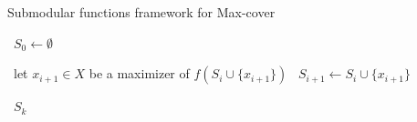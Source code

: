 \begin{algorithm}
    \caption{Submodular functions framework for Max-cover}\label{alg:greedy_submodular}
    \begin{algorithmic}%
            \State~$S_0 \gets \emptyset$

                \State~let $x_{i+1} \in X$ be a maximizer of $f(S_i \cup \{x_{i+1}\})$  %
                \State~$S_{i+1} \gets S_i \cup \{x_{i+1}\}$
            \EndFor
            
            \Return~$S_k$
        \EndProcedure
    \end{algorithmic}
\end{algorithm}